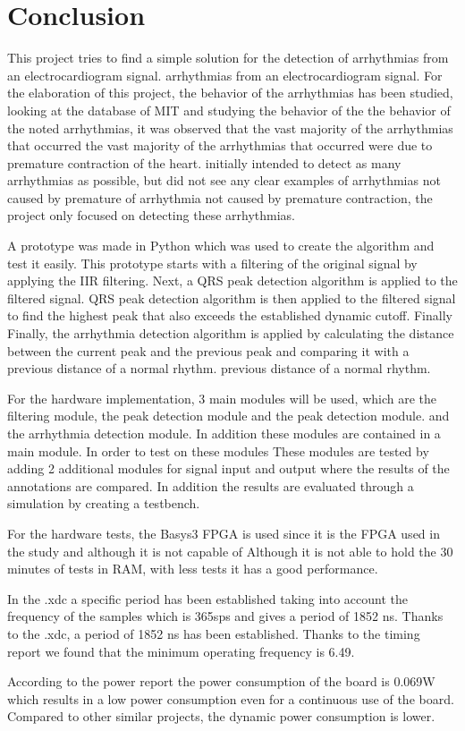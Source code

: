 \section{Conclusion}

This project tries to find a simple solution for the detection of arrhythmias from an electrocardiogram signal. 
arrhythmias from an electrocardiogram signal. For the elaboration of this project, 
the behavior of the arrhythmias has been studied, looking at the database of MIT and studying the behavior of the
the behavior of the noted arrhythmias, it was observed that the vast majority of the arrhythmias that occurred 
the vast majority of the arrhythmias that occurred were due to premature contraction of the heart.
initially intended to detect as many arrhythmias as possible, but did not see any clear examples of arrhythmias not caused by premature
of arrhythmia not caused by premature contraction, the project only focused on detecting these arrhythmias.

A prototype was made in Python which was used to create the algorithm and test it easily. This prototype starts
with a filtering of the original signal by applying the IIR filtering. Next, a QRS peak detection algorithm is applied to the filtered signal. 
QRS peak detection algorithm is then applied to the filtered signal to find the highest peak that also exceeds the established dynamic cutoff. Finally
Finally, the arrhythmia detection algorithm is applied by calculating the distance between the current peak and the previous peak and comparing it with a previous distance of a normal rhythm.
previous distance of a normal rhythm.

For the hardware implementation, 3 main modules will be used, which are the filtering module, the peak detection module and the peak detection module. 
and the arrhythmia detection module. In addition these modules are contained in a main module. In order to test on these modules
These modules are tested by adding 2 additional modules for signal input and output where the results of the annotations are compared. In addition 
the results are evaluated through a simulation by creating a testbench.

For the hardware tests, the Basys3 FPGA is used since it is the FPGA used in the study and although it is not capable of 
Although it is not able to hold the 30 minutes of tests in RAM, with less tests it has a good performance.

In the .xdc a specific period has been established taking into account the frequency of the samples which is 365sps and gives a period of 1852 ns. Thanks to the .xdc, a period of 1852 ns has been established. 
Thanks to the timing report we found that the minimum operating frequency is 6.49.

According to the power report the power consumption of the board is 0.069W which results in a low power consumption even for a continuous use of the board.
Compared to other similar projects, the dynamic power consumption is lower.

